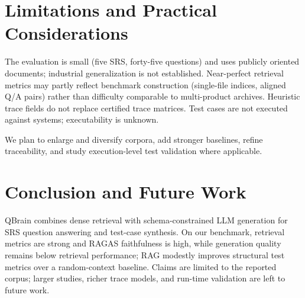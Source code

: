 \documentclass[conference]{IEEEtran}
\begin{document}
\section{Limitations and Practical Considerations}
\label{sec:limitations}

The evaluation is small (five SRS, forty-five questions) and uses publicly oriented documents; industrial generalization is not established. Near-perfect retrieval metrics may partly reflect benchmark construction (single-file indices, aligned Q/A pairs) rather than difficulty comparable to multi-product archives. Heuristic trace fields do not replace certified trace matrices. Test cases are not executed against systems; executability is unknown.

We plan to enlarge and diversify corpora, add stronger baselines, refine traceability, and study execution-level test validation where applicable.

\section{Conclusion and Future Work}
\label{sec:conclusion}

QBrain combines dense retrieval with schema-constrained LLM generation for SRS question answering and test-case synthesis. On our benchmark, retrieval metrics are strong and RAGAS faithfulness is high, while generation quality remains below retrieval performance; RAG modestly improves structural test metrics over a random-context baseline. Claims are limited to the reported corpus; larger studies, richer trace models, and run-time validation are left to future work.



\end{document}
